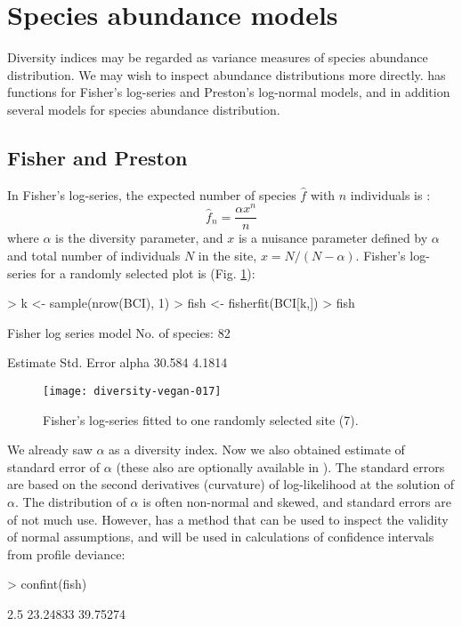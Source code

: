\documentclass[a4paper,10pt,twocolumn]{article}
\begin{document}
\section{Species abundance models}

Diversity indices may be regarded as variance measures of species
abundance distribution.  We may wish to inspect abundance
distributions more directly.   has functions for
Fisher's log-series and Preston's log-normal models, and in addition
several models for species abundance distribution.

\subsection{Fisher and Preston}

In Fisher's log-series, the expected number of species $\hat f$ with $n$
individuals is \citep{FisherEtal43}:
\begin{equation}
\hat f_n = \frac{\alpha x^n}{n}
\end{equation}
where $\alpha$ is the diversity parameter, and $x$ is a nuisance
parameter defined by $\alpha$ and total number
of individuals $N$ in the site, $x = N/(N-\alpha)$.  Fisher's
log-series for a randomly selected plot is (Fig. \ref{fig:fisher}):
\begin{Schunk}
\begin{Sinput}
> k <- sample(nrow(BCI), 1)
> fish <- fisherfit(BCI[k,])
> fish
\end{Sinput}
\begin{Soutput}
Fisher log series model
No. of species: 82 

      Estimate Std. Error
alpha   30.584     4.1814
\end{Soutput}
\end{Schunk}
\begin{figure}
\texttt{[image: diversity-vegan-017]}
\caption{Fisher's log-series fitted to one randomly selected site
  (7).}
\label{fig:fisher}
\end{figure}
We already saw $\alpha$ as a diversity index.  Now we also obtained
estimate of standard error of $\alpha$ (these also are optionally
available in ).  The standard errors are based on
the second derivatives (curvature) of log-likelihood at the solution
of $\alpha$.  The distribution of $\alpha$ is often non-normal
and skewed, and standard errors are of not much use.  However,
 has a  method that can be used to
inspect the validity of normal assumptions, and will be used in
calculations of confidence intervals from profile deviance:
\begin{Schunk}
\begin{Sinput}
> confint(fish)
\end{Sinput}
\begin{Soutput}
   2.5 %   97.5 % 
23.24833 39.75274 
\end{Soutput}
\end{Schunk}
\end{document}
